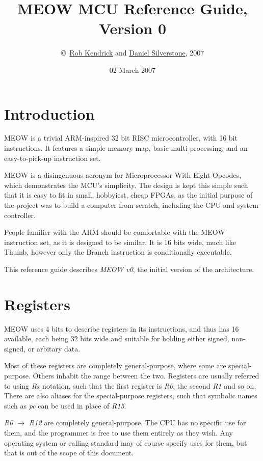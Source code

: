 \documentclass[a4paper,twoside]{book}
\author{\copyright~\href{http://www.rjek.com/}{Rob Kendrick} and
         \href{http://www.digital-scurf.org}{Daniel Silverstone}, 2007}
\title{MEOW MCU Reference Guide, Version 0}
\date{02 March 2007}
\begin{document}
  \tableofcontents{}
  
  \chapter{Introduction}
    MEOW is a trivial ARM-inspired 32 bit RISC microcontroller, with 16 bit
    instructions.  It features a simple memory map, basic multi-processing,
    and an easy-to-pick-up instruction set.

    MEOW is a disingenuous acronym for Microprocessor With Eight Opcodes,
    which demonstrates the MCU's simplicity.  The design is kept this simple
    such that it is easy to fit in small, hobbyiest, cheap FPGAs, as the
    initial purpose of the project was to build a computer from scratch,
    including the CPU and system controller.

    People familier with the ARM should be comfortable with the MEOW
    instruction set, as it is designed to be similar.  It is 16 bits wide,
    much like Thumb, however only the Branch instruction is conditionally
    executable.
    
    This reference guide describes \emph{MEOW v0}, the initial version of
    the architecture.
  
  \chapter{Registers}
    MEOW uses 4 bits to describe registers in its instructions, and thus has
    16 available, each being 32 bits wide and suitable for holding either
    signed, non-signed, or arbitary data.
    
    Most of these registers are completely general-purpose, where some are 
    special-purpose.  Others inhabit the range between the two.  Registers are
    usually referred to using \emph{Rx} notation, such that the first
    register is \emph{R0}, the second \emph{R1} and so on.  There are also
    aliases for the special-purpose registers, such that symbolic names
    such as \emph{pc} can be used in place of \emph{R15}.
    
    \emph{R0 $\to$ R12} are completely general-purpose.  The CPU has no
    specific use for them, and the programmer is free to use them entirely as
    they wish.  Any operating system or calling standard may of course
    specify uses for them, but that is out of the scope of this document.
    
\end{document}
